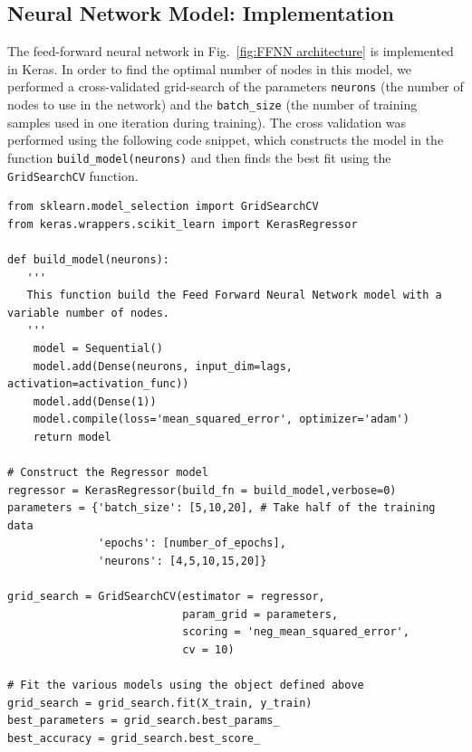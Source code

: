 \documentclass[10pt,a4paper]{article}
\begin{document}
\subsection{Neural Network Model: Implementation}\label{section: Fitting NN}
The feed-forward neural network in Fig.~\ref{fig:FFNN architecture} is implemented in Keras. In order to find the optimal number of nodes in this model, we performed a cross-validated grid-search of the parameters \verb|neurons| (the number of nodes to use in the network) and the \verb|batch_size| (the number of training samples used in one iteration during training). The cross validation was performed using the following code snippet, which constructs the model in the function \verb|build_model(neurons)|
and then finds the best fit using the \verb|GridSearchCV| function.
\begin{lstlisting}
from sklearn.model_selection import GridSearchCV
from keras.wrappers.scikit_learn import KerasRegressor

def build_model(neurons):
   '''
   This function build the Feed Forward Neural Network model with a variable number of nodes.
   '''
    model = Sequential()
    model.add(Dense(neurons, input_dim=lags, activation=activation_func))
    model.add(Dense(1))
    model.compile(loss='mean_squared_error', optimizer='adam')
    return model

# Construct the Regressor model
regressor = KerasRegressor(build_fn = build_model,verbose=0)
parameters = {'batch_size': [5,10,20], # Take half of the training data
              'epochs': [number_of_epochs],
              'neurons': [4,5,10,15,20]}
              
grid_search = GridSearchCV(estimator = regressor,
                           param_grid = parameters,
                           scoring = 'neg_mean_squared_error',
                           cv = 10)
                           
# Fit the various models using the object defined above
grid_search = grid_search.fit(X_train, y_train)
best_parameters = grid_search.best_params_
best_accuracy = grid_search.best_score_
\end{lstlisting}
\end{document}
